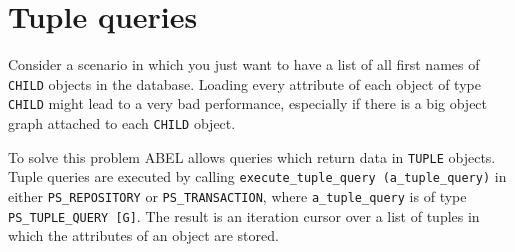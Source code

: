\documentclass[a4paper,12pt]{report}
\begin{document}
% 
% 

\chapter{Tuple queries}

Consider a scenario in which you just want to have a list of all first names of \lstinline !CHILD! objects in the database. 
Loading every attribute of each object of type \lstinline!CHILD! might lead to a very bad performance, especially if there is a big object graph attached to each \lstinline!CHILD! object.

To solve this problem ABEL allows queries which return data in \lstinline!TUPLE! objects.
Tuple queries are executed by calling  \lstinline!execute_tuple_query (a_tuple_query)! in either \lstinline!PS_REPOSITORY! or \lstinline!PS_TRANSACTION!, 
where \lstinline!a_tuple_query! is of type \lstinline!PS_TUPLE_QUERY [G]!.
The result is an iteration cursor over a list of tuples in which the attributes of an object are stored.
\end{document}
